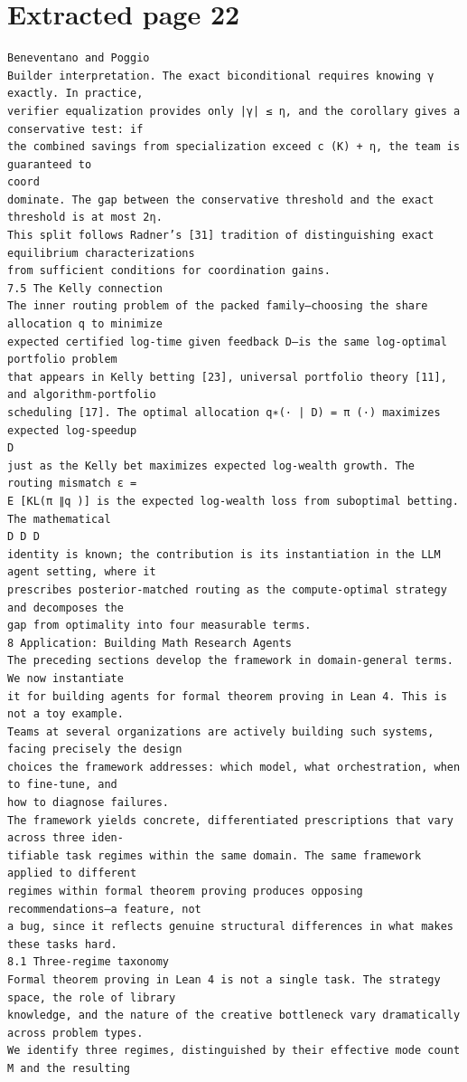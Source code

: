 \documentclass[11pt]{article}
\begin{document}
\clearpage
\section*{Extracted page 22}
\begin{verbatim}
Beneventano and Poggio
Builder interpretation. The exact biconditional requires knowing γ exactly. In practice,
verifier equalization provides only |γ| ≤ η, and the corollary gives a conservative test: if
the combined savings from specialization exceed c (K) + η, the team is guaranteed to
coord
dominate. The gap between the conservative threshold and the exact threshold is at most 2η.
This split follows Radner’s [31] tradition of distinguishing exact equilibrium characterizations
from sufficient conditions for coordination gains.
7.5 The Kelly connection
The inner routing problem of the packed family—choosing the share allocation q to minimize
expected certified log-time given feedback D—is the same log-optimal portfolio problem
that appears in Kelly betting [23], universal portfolio theory [11], and algorithm-portfolio
scheduling [17]. The optimal allocation q∗(· | D) = π (·) maximizes expected log-speedup
D
just as the Kelly bet maximizes expected log-wealth growth. The routing mismatch ε =
E [KL(π ∥q )] is the expected log-wealth loss from suboptimal betting. The mathematical
D D D
identity is known; the contribution is its instantiation in the LLM agent setting, where it
prescribes posterior-matched routing as the compute-optimal strategy and decomposes the
gap from optimality into four measurable terms.
8 Application: Building Math Research Agents
The preceding sections develop the framework in domain-general terms. We now instantiate
it for building agents for formal theorem proving in Lean 4. This is not a toy example.
Teams at several organizations are actively building such systems, facing precisely the design
choices the framework addresses: which model, what orchestration, when to fine-tune, and
how to diagnose failures.
The framework yields concrete, differentiated prescriptions that vary across three iden-
tifiable task regimes within the same domain. The same framework applied to different
regimes within formal theorem proving produces opposing recommendations—a feature, not
a bug, since it reflects genuine structural differences in what makes these tasks hard.
8.1 Three-regime taxonomy
Formal theorem proving in Lean 4 is not a single task. The strategy space, the role of library
knowledge, and the nature of the creative bottleneck vary dramatically across problem types.
We identify three regimes, distinguished by their effective mode count M and the resulting

\end{verbatim}
\end{document}
